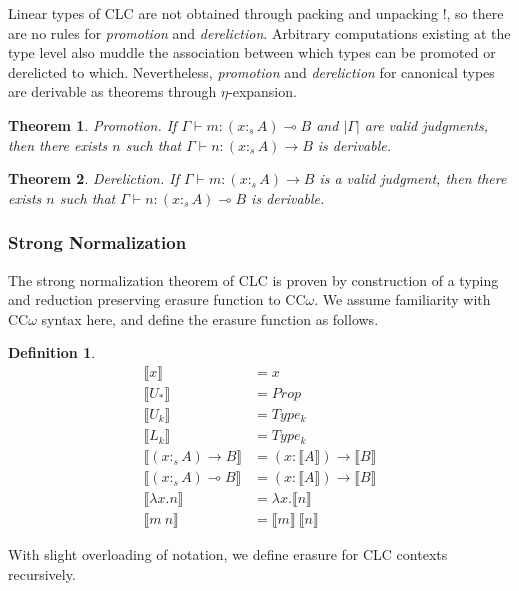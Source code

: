 \documentclass[sigplan,screen,review,authordraft]{acmart}
\newtheorem{theorem}{Theorem}[section]
\theoremstyle{definition}
\newtheorem{definition}{Definition}[section]
\newcommand{\pure}[1]{|#1|}
\newcommand{\stype}[1]{:_#1}
\newcommand{\erase}[1]{\llbracket #1 \rrbracket}
\begin{document}
  Linear types of CLC are not obtained through packing and unpacking !, so there are no rules for \textit{promotion} and \textit{dereliction}. Arbitrary computations existing at the type level also muddle the association between which types can be promoted or derelicted to which. Nevertheless, \textit{promotion} and \textit{dereliction} for canonical types are derivable as theorems through $\eta$-expansion.

  \begin{theorem} 
    Promotion. If $\Gamma \vdash m : (x \stype{s} A) \multimap B$ and $\pure{\Gamma}$ are valid judgments, then there exists $n$ such that $\Gamma \vdash n : (x \stype{s} A) \rightarrow B$ is derivable.
  \end{theorem}

  \begin{theorem} 
    Dereliction. If $\Gamma \vdash m : (x \stype{s} A) \rightarrow B$ is a valid judgment, then there exists $n$ such that $\Gamma \vdash n : (x \stype{s} A) \multimap B$ is derivable.
  \end{theorem}

  \subsubsection{Strong Normalization}
  The strong normalization theorem of CLC is proven by construction of a typing and reduction preserving erasure function to CC$\omega$. We assume familiarity with CC$\omega$ syntax here, and define the erasure function as follows.

  \begin{definition}
    \begin{align*}
      \erase{x} &= x \\
      \erase{U_*} &= Prop \\
      \erase{U_k} &= Type_k \\
      \erase{L_k} &= Type_k \\
      \erase{(x \stype{s} A) \rightarrow B} &= (x : \erase{A}) \rightarrow \erase{B} \\
      \erase{(x \stype{s} A) \multimap B} &= (x : \erase{A}) \rightarrow \erase{B} \\
      \erase{\lambda x.n} &= \lambda x.\erase{n} \\
      \erase{m\ n} &= \erase{m}\ \erase{n}
    \end{align*}
  \end{definition}

  With slight overloading of notation, we define erasure for CLC contexts recursively.
\end{document}
